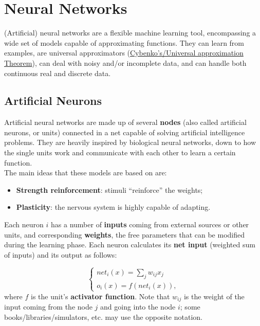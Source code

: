\chapter{Neural Networks}

(Artificial) neural networks are a flexible machine learning tool, encompassing a wide set of models capable of approximating functions. They can learn from examples, are universal approximators (\href{https://en.wikipedia.org/wiki/Universal_approximation_theorem}{Cybenko's/Universal approximation Theorem}), can deal with noisy and/or incomplete data, and can handle both continuous real and discrete data.

\section{Artificial Neurons}

Artificial neural networks are made up of several \textbf{nodes} (also called artificial neurons, or units) connected in a net capable of solving artificial intelligence problems. They are heavily inspired by biological neural networks, down to how the single units work and communicate with each other to learn a certain function. \\
The main ideas that these models are based on are:

\begin{itemize}
    \item \textbf{Strength reinforcement}: stimuli ``reinforce'' the weights;

    \item \textbf{Plasticity}: the nervous system is highly capable of adapting.
\end{itemize}

Each neuron $i$ has a number of \textbf{inputs} coming from external sources or other units, and corresponding \textbf{weights}, the free parameters that can be modified during the learning phase. Each neuron calculates its \textbf{net input} (weighted sum of inputs) and its output as follows:

\begin{equation*}
    \begin{cases}
        net_i(x) = \sum_j w_{ij} x_j \\
        o_i(x) = f(net_i(x)),
    \end{cases}
\end{equation*}
where $f$ is the unit's \textbf{activator function}. Note that $w_{ij}$ is the weight of the input coming from the node $j$ and going into the node $i$; some books/libraries/simulators, etc. may use the opposite notation.

